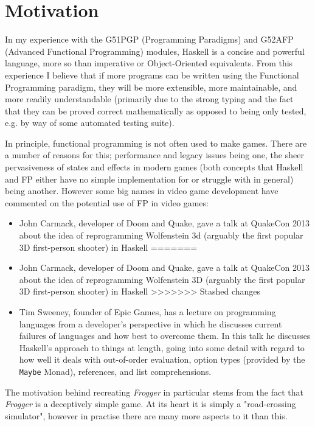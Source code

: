 \documentclass[12pt, a4paper]{report}
\begin{document}
\section{Motivation}
In my experience with the G51PGP (Programming Paradigms) and G52AFP (Advanced Functional Programming) modules, Haskell is a concise and powerful language, more so than imperative or Object-Oriented equivalents.
From this experience I believe that if more programs can be written using the Functional Programming paradigm, they will be more extensible, more maintainable, and more readily understandable (primarily due to the strong typing and the fact that they can be proved correct mathematically as opposed to being only tested, e.g. by way of some automated testing suite).
\par
In principle, functional programming is not often used to make games.
There are a number of reasons for this; performance and legacy issues being one, the sheer pervasiveness of states and effects in modern games (both concepts that Haskell and FP either have no simple implementation for or struggle with in general) being another.
However some big names in video game development have commented on the potential use of FP in video games:
\begin{itemize}
<<<<<<< Updated upstream
  \item John Carmack, developer of Doom and Quake, gave a talk at QuakeCon 2013 about the idea of reprogramming Wolfenstein 3d (arguably the first popular 3D first-person shooter) in Haskell\cite{carmackspeech}
=======
  \item John Carmack, developer of Doom and Quake, gave a talk at QuakeCon 2013 about the idea of reprogramming Wolfenstein 3D (arguably the first popular 3D first-person shooter) in Haskell\cite{carmackspeech}
>>>>>>> Stashed changes
  \item Tim Sweeney, founder of Epic Games, has a lecture on programming languages from a developer's perspective in which he discusses current failures of languages and how best to overcome them.
    In this talk he discusses Haskell's approach to things at length, going into some detail with regard to how well it deals with out-of-order evaluation, option types (provided by the \verb|Maybe| Monad), references, and list comprehensions\cite{sweeneytalk}.
\end{itemize}
\par
The motivation behind recreating \textit{Frogger} in particular stems from the fact that \textit{Frogger} is a deceptively simple game.
At its heart it is simply a "road-crossing simulator", however in practise there are many more aspects to it than this.
\end{document}
